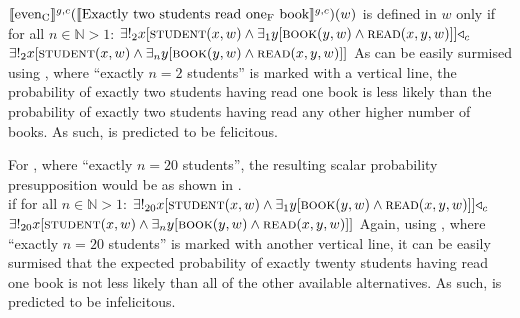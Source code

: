 \ex{}
$\intension[g,c]{even\textsubscript{C}}(\intension[g,c]{Exactly two students read one\textsubscript{F} book})(w)$ is defined in $w$ only if for all $n\in\mathbb{N}>1$: $\exists!_2{x}[\predicate{student}(x,w)\land\exists_1{y}[\predicate{book}(y,w)\land\predicate{read}(x,y,w)]]\lprob_c$\\\emptyfill$\exists!_2{x}[\predicate{student}(x,w)\land\exists_n{y}[\predicate{book}(y,w)\land\predicate{read}(x,y,w)]]$
\xe
As can be easily surmised using , where \enquote{exactly $n=2$ students} is marked with a vertical line, the probability of exactly two students having read one book is less likely than the probability of exactly two students having read any other higher number of books. As such,  is predicted to be felicitous.

For , where \enquote{exactly $n=20$ students}, the resulting scalar probability presupposition would be as shown in .
\ex{}
{}\\if for all $n\in\mathbb{N}>1$: $\exists!_{20}{x}[\predicate{student}(x,w)\land\exists_1{y}[\predicate{book}(y,w)\land\predicate{read}(x,y,w)]]\lprob_c$\\\emptyfill$\exists!_{20}{x}[\predicate{student}(x,w)\land\exists_n{y}[\predicate{book}(y,w)\land\predicate{read}(x,y,w)]]$
\xe
Again, using , where \enquote{exactly $n=20$ students} is marked with another vertical line, it can be easily surmised that the expected probability of exactly twenty students having read one book is not less likely than all of the other available alternatives. As such,  is predicted to be infelicitous.


